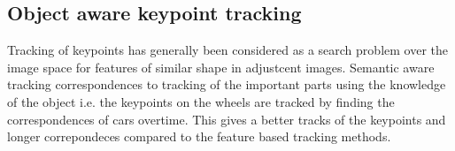 \documentclass[10pt,twocolumn,letterpaper]{article}
\begin{document}
\subsection{Object aware keypoint tracking}
Tracking of keypoints has generally been considered as a search problem over the image space for features of similar shape in adjustcent images. Semantic aware tracking correspondences to tracking of the important parts using the knowledge of the object i.e. the keypoints on the wheels are tracked by finding the correspondences of cars overtime. This gives a better tracks of the keypoints and longer correpondeces compared to the feature based tracking methods. 

{\small


}
\end{document}
